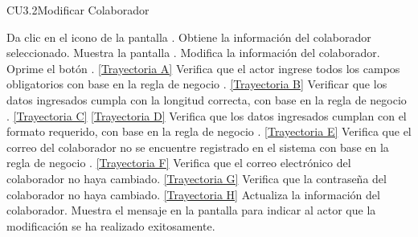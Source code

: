 \begin{UseCase}{CU3.2}{Modificar Colaborador}
	\end{UseCase}
	\begin{UCtrayectoria}
		\UCpaso[\UCactor] Da clic en el icono \editar de la pantalla .
		\UCpaso[\UCsist] Obtiene la información del colaborador seleccionado.
		\UCpaso[\UCsist] Muestra la pantalla .
		\UCpaso[\UCactor] Modifica la información del colaborador. \label{CU3.2-P5}
		\UCpaso[\UCactor] Oprime el botón . \hyperlink{CU3-2:TAA}{[Trayectoria A]}
		\UCpaso[\UCsist] Verifica que el actor ingrese todos los campos obligatorios con base en la regla de negocio . \hyperlink{CU3-2:TAB}{[Trayectoria B]}
		\UCpaso[\UCsist] Verificar que los datos ingresados cumpla con la longitud correcta, con base en la regla de negocio . \hyperlink{CU3-2:TAC}{[Trayectoria C]} \hyperlink{CU3-2:TAD}{[Trayectoria D]}
		\UCpaso[\UCsist] Verifica que los datos ingresados cumplan con el formato requerido, con base en la regla de negocio . \hyperlink{CU3-2:TAE}{[Trayectoria E]} 
		\UCpaso[\UCsist] Verifica que el correo del colaborador no se encuentre registrado en el sistema con base en la regla de negocio . \hyperlink{CU3-2:TAF}{[Trayectoria F]}
		\UCpaso[\UCsist] Verifica que el correo electrónico del colaborador no haya cambiado. \hyperlink{CU3-2:TAG}{[Trayectoria G]}
		\UCpaso[\UCsist] Verifica que la contraseña del colaborador no haya cambiado. \hyperlink{CU3-2:TAH}{[Trayectoria H]}
		\UCpaso[\UCsist] Actualiza la información del colaborador.\label{CU3.2-P10}
		\UCpaso[\UCsist] Muestra el mensaje  en la pantalla  para indicar al actor que la modificación se ha realizado exitosamente. 
	\end{UCtrayectoria}		
